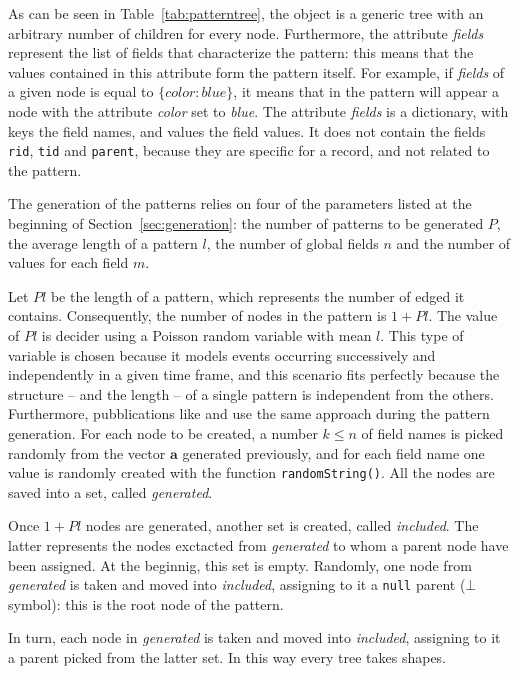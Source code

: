 \documentclass{acm_proc_article-sp-sigmod09}
\begin{document}
As can be seen in Table~\ref{tab:patterntree}, the object is a generic tree with an arbitrary number of children for every node. Furthermore, the attribute \emph{fields} represent the list of fields that characterize the pattern: this means that the values contained in this attribute form the pattern itself. For example, if \emph{fields} of a given node is equal to $ \{ color : blue \} $, it means that in the pattern will appear a node with the attribute \emph{color} set to \emph{blue}. The attribute \emph{fields} is a dictionary, with keys the field names, and values the field values. It does not contain the fields \texttt{rid}, \texttt{tid} and \texttt{parent}, because they are specific for a record, and not related to the pattern.

The generation of the patterns relies on four of the parameters listed at the beginning of Section~\ref{sec:generation}: the number of patterns to be generated $P$, the average length of a pattern $l$, the number of global fields $n$ and the number of values for each field $m$.

Let $Pl$ be the length of a pattern, which represents the number of edged it contains. Consequently, the number of nodes in the pattern is $1 + Pl$. The value of $Pl$ is decider using a Poisson random variable with mean $l$. This type of variable is chosen because it models events occurring successively and independently in a given time frame, and this scenario fits perfectly because the structure -- and the length -- of a single pattern is independent from the others. Furthermore, pubblications like \cite{agrawal1994fast} and \cite{ivancsy2006time} use the same approach during the pattern generation. For each node to be created, a number $k \le n$ of field names is picked randomly from the vector $\boldsymbol{a}$ generated previously, and for each field name one value is randomly created with the function \texttt{randomString()}. All the nodes are saved into a set, called \emph{generated}.

Once $1 + Pl$ nodes are generated, another set is created, called \emph{included}. The latter represents the nodes exctacted from \emph{generated} to whom a parent node have been assigned. At the beginnig, this set is empty. Randomly, one node from \emph{generated} is taken and moved into \emph{included}, assigning to it a \texttt{null} parent ($\bot$ symbol): this is the root node of the pattern. 

In turn, each node in \emph{generated} is taken and moved into \emph{included}, assigning to it a parent picked from the latter set. In this way every tree takes shapes.
\end{document}
